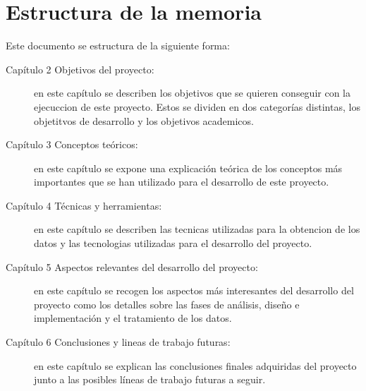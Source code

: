 \section{Estructura de la memoria}

Este documento se estructura de la siguiente forma:
\begin{description}

\item[Capítulo 2 Objetivos del proyecto:] en este capítulo se describen los objetivos que se quieren conseguir con la ejecuccion de este proyecto. Estos se dividen en dos categorías distintas,
los objetitvos de desarrollo y los objetivos academicos.


\item[Capítulo 3 Conceptos teóricos:] en este capítulo se expone una explicación teórica de los conceptos más importantes que se han utilizado para el desarrollo de este proyecto.

\item[Capítulo 4 Técnicas y herramientas:] en este capítulo se describen las tecnicas utilizadas para la obtencion de los datos y las tecnologias utilizadas para el desarrollo del proyecto.


\item[Capítulo 5 Aspectos relevantes del desarrollo del proyecto:] en este capítulo se recogen los aspectos más interesantes del desarrollo del proyecto como los detalles sobre las fases de análisis, diseño e implementación y el tratamiento de los datos.


\item[Capítulo 6 Conclusiones y lineas de trabajo futuras:] en este capítulo se explican las conclusiones finales adquiridas del proyecto junto a las posibles líneas de trabajo futuras a seguir.



\end{description}



